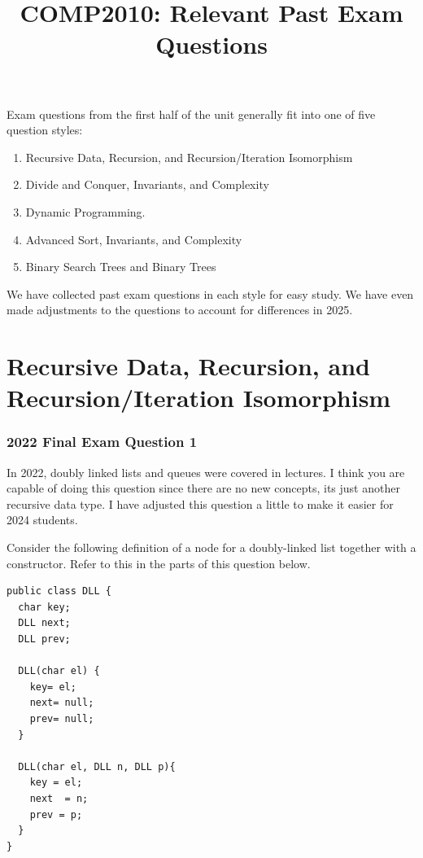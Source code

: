 \documentclass[twoside=false,DIV=14]{scrartcl}
\title{\color{redish} \vspace{-2em}COMP2010: Relevant Past Exam Questions}
\begin{document}
{\color{blackish}\maketitle}\vspace{-2em}
Exam questions from the first half of the unit generally fit into one of five question styles:
\begin{enumerate}
\item Recursive Data, Recursion, and Recursion/Iteration Isomorphism
\item Divide and Conquer, Invariants, and Complexity
\item Dynamic Programming.
\item Advanced Sort, Invariants, and Complexity
\item Binary Search Trees and Binary Trees
\end{enumerate}
We have collected past exam questions in each style for easy study.  We have even made adjustments to the questions to account for differences in 2025.

\newpage\setcounter{section}{0}
\part*{Recursive Data, Recursion, and Recursion/Iteration Isomorphism}

\section{2022 Final Exam Question 1}
\begin{note}
In 2022, doubly linked lists and queues were covered in lectures. I think you are capable of doing this question since there are no new concepts, its just another recursive data type.  I have adjusted this question a little to make it easier for 2024 students.
\end{note}
Consider the following definition of a node for a doubly-linked list together with a constructor. Refer to this in the parts of this question below.

\begin{lstlisting}
public class DLL {
  char key;
  DLL next;
  DLL prev;
  
  DLL(char el) {
    key= el;
    next= null;
    prev= null;
  }

  DLL(char el, DLL n, DLL p){
    key = el;
    next  = n;
    prev = p;
  }
}       
\end{lstlisting}
\end{document}
